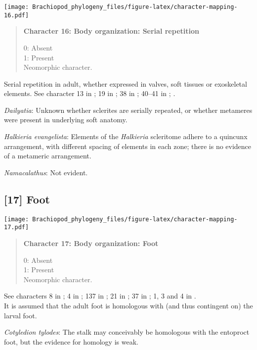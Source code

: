 \documentclass[openany]{book}
\theoremstyle{definition}
\theoremstyle{definition}
\theoremstyle{definition}
\theoremstyle{remark}
\begin{document}
\texttt{[image: Brachiopod\_phylogeny\_files/figure-latex/character-mapping-16.pdf]}

\begin{quote}
\textbf{Character 16: Body organization: Serial repetition}

0: Absent\\
1: Present\\
Neomorphic character.
\end{quote}

Serial repetition in adult, whether expressed in valves, soft tissues or
exoskeletal elements. See character 13 in \citet{Rouse1999}; 19 in
\citet{Vinther2008}; 38 in \citet{Haszprunar1996}; 40--41 in
\citet{Sutton2012}; \citet{Wanninger2009}.

\hypertarget{Dailyatia-coding-16}{}
\emph{Dailyatia}: Unknown whether sclerites are serially repeated, or
whether metameres were present in underlying soft anatomy.

\hypertarget{Halkieria_evangelista-coding-16}{}
\emph{Halkieria evangelista}: Elements of the \emph{Halkieria}
scleritome adhere to a quincunx arrangement, with different spacing of
elements in each zone; there is no evidence of a metameric arrangement.

\hypertarget{Namacalathus-coding-16}{}
\emph{Namacalathus}: Not evident.

\subsection*{{[}17{]} Foot}\label{foot}

\texttt{[image: Brachiopod\_phylogeny\_files/figure-latex/character-mapping-17.pdf]}

\begin{quote}
\textbf{Character 17: Body organization: Foot}

0: Absent\\
1: Present\\
Neomorphic character.
\end{quote}

See characters 8 in \citet{Haszprunar1996}; 4 in \citet{Vinther2008};
137 in \citet{Rouse1999}; 21 in \citet{BucklandNicks2008}; 37 in
\citet{Sutton2012}; 1, 3 and 4 in \citet{Haszprunar2008}.\\
It is assumed that the adult foot is homologous with (and thus
contingent on) the larval foot.

\hypertarget{Cotyledion_tylodes-coding-17}{}
\emph{Cotyledion tylodes}: The stalk may conceivably be homologous with
the entoproct foot, but the evidence for homology is weak.
\end{document}
